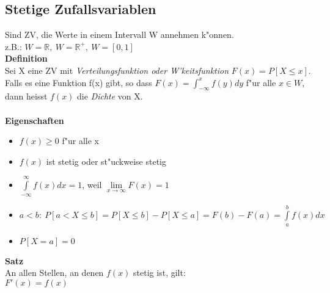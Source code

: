 \documentclass[10pt, a4paper, twocolumn]{scrartcl}
\begin{document}
\subsection{Stetige Zufallsvariablen}

Sind ZV, die Werte in einem Intervall W annehmen k"onnen.\\
z.B.: $W=\mathbb{R},\:W=\mathbb{R}^+,\:W=[0,1]$\\
\textbf{Definition}\\
Sei X eine ZV mit \textit{Verteilungsfunktion oder W'keitsfunktion} $F(x)=P[X\leq x]$.\\
Falls es eine Funktion f(x) gibt, so dass $F(x)=\int^x_{-\infty}f(y)dy$ f"ur alle $x \in W$, dann heisst $f(x)$ die \textit{Dichte} von X.\\\\

\textbf{Eigenschaften}
\begin{itemize}
 \item $f(x)\geq 0$ f"ur alle x
 \item $f(x)$ ist stetig oder st"uckweise stetig
 \item $\int\limits^{\infty}_{-\infty}f(x)dx=1$, weil $\lim\limits_{x\rightarrow\infty}F(x)=1$
 \item $a<b:\:P[a<X\leq b]=P[X\leq b]-P[X\leq a]=F(b)-F(a)=\int\limits^b_a f(x)dx$
 \item $P[X=a]=0$
\end{itemize}

\textbf{Satz}\\
An allen Stellen, an denen $f(x)$ stetig ist, gilt:\\
$F'(x)=f(x)$\\\\
\end{document}
